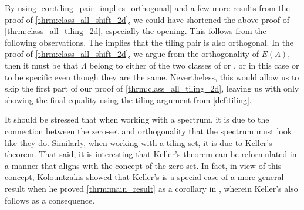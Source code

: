 \documentclass[../thesis.tex]{subfiles}
\begin{document}
\begin{remark}
    By using \cref{cor:tiling_pair_implies_orthogonal} and a few more results from the proof of \cref{thrm:class_all_shift_2d}, we could have shortened the above proof of \cref{thrm:class_all_tiling_2d}, especially the opening. This follows from the following observations. The  implies that the tiling pair is also orthogonal. In the proof of \cref{thrm:class_all_shift_2d}, we argue from the orthogonality of $E(\Lambda)$, then it must be that $\Lambda$ belong to either of the two classes of  or , or in this case  or  to be specific even though they are the same. Nevertheless, this would allow us to skip the first part of our proof of \cref{thrm:class_all_tiling_2d}, leaving us with only showing the final equality using the tiling argument from \cref{def:tiling}.
\end{remark}

It should be stressed that when working with a spectrum, it is due to the connection between the zero-set and orthogonality that the spectrum must look like they do. Similarly, when working with a tiling set, it is due to Keller's theorem. That said, it is interesting that Keller's theorem can be reformulated in a manner that aligns with the concept of the zero-set. In fact, in view of this concept, Kolountzakis showed that Keller's  is a special case of a more general result when he proved \cref{thrm:main_result} as a corollary in \cite{kolountzakisPackingTilingOrthogonality2000}, wherein Keller's  also follows as a consequence.

\end{document}

